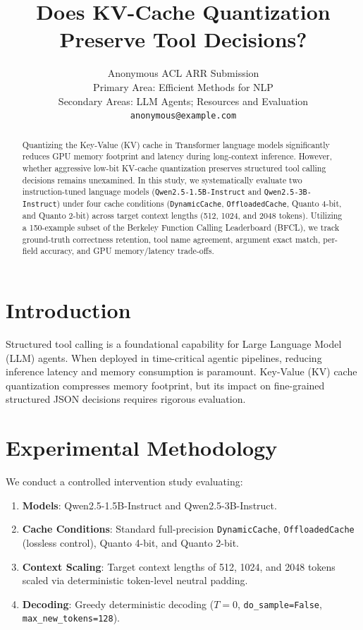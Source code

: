 \documentclass[11pt,a4paper]{article}
\title{Does KV-Cache Quantization Preserve Tool Decisions?}
\author{Anonymous ACL ARR Submission \\
  Primary Area: Efficient Methods for NLP \\
  Secondary Areas: LLM Agents; Resources and Evaluation \\
  \texttt{anonymous@example.com}}
\date{}
\begin{document}
\maketitle

\begin{abstract}
Quantizing the Key-Value (KV) cache in Transformer language models significantly reduces GPU memory footprint and latency during long-context inference. However, whether aggressive low-bit KV-cache quantization preserves structured tool calling decisions remains unexamined. In this study, we systematically evaluate two instruction-tuned language models (\texttt{Qwen2.5-1.5B-Instruct} and \texttt{Qwen2.5-3B-Instruct}) under four cache conditions (\texttt{DynamicCache}, \texttt{OffloadedCache}, Quanto 4-bit, and Quanto 2-bit) across target context lengths (512, 1024, and 2048 tokens). Utilizing a 150-example subset of the Berkeley Function Calling Leaderboard (BFCL), we track ground-truth correctness retention, tool name agreement, argument exact match, per-field accuracy, and GPU memory/latency trade-offs.
\end{abstract}

\section{Introduction}
Structured tool calling is a foundational capability for Large Language Model (LLM) agents. When deployed in time-critical agentic pipelines, reducing inference latency and memory consumption is paramount. Key-Value (KV) cache quantization compresses memory footprint, but its impact on fine-grained structured JSON decisions requires rigorous evaluation.

\section{Experimental Methodology}
We conduct a controlled intervention study evaluating:
\begin{enumerate}
    \item \textbf{Models}: Qwen2.5-1.5B-Instruct and Qwen2.5-3B-Instruct.
    \item \textbf{Cache Conditions}: Standard full-precision \texttt{DynamicCache}, \texttt{OffloadedCache} (lossless control), Quanto 4-bit, and Quanto 2-bit.
    \item \textbf{Context Scaling}: Target context lengths of 512, 1024, and 2048 tokens scaled via deterministic token-level neutral padding.
    \item \textbf{Decoding}: Greedy deterministic decoding ($T=0$, \texttt{do\_sample=False}, \texttt{max\_new\_tokens=128}).
\end{enumerate}
\end{document}
